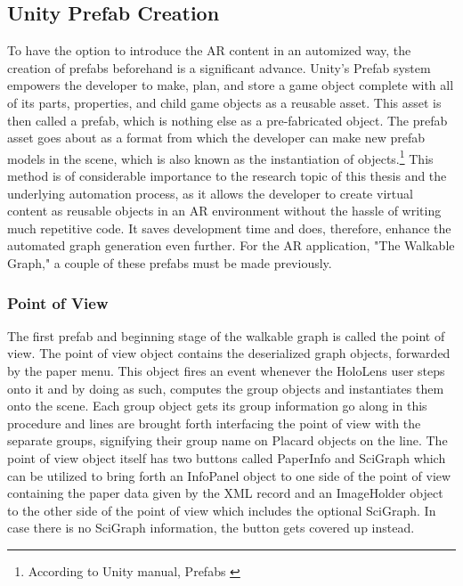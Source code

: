 \documentclass[12pt,a4paper,oneside,american,parskip=half]{article}
\begin{document}
\begin{justify}
\begin{normalsize}
\subsection{Unity Prefab Creation}
To have the option to introduce the AR content in an automized way, the creation of prefabs beforehand is a significant advance. Unity's Prefab system empowers the developer to make, plan, and store a game object complete with all of its parts, properties, and child game objects as a reusable asset. This asset is then called a prefab, which is nothing else as a pre-fabricated object. 
The prefab asset goes about as a format from which the developer can make new prefab models in the scene, which is also known as the instantiation of objects.\footnote{According to Unity manual, Prefabs \cite{unity1}}
\newline
This method is of considerable importance to the research topic of this thesis and the underlying automation process, as it allows the developer to create virtual content as reusable objects in an AR environment without the hassle of writing much repetitive code. It saves development time and does, therefore, enhance the automated graph generation even further.
\newline
For the AR application, "The Walkable Graph," a couple of these prefabs must be made previously.

\subsubsection{Point of View}
The first prefab and beginning stage of the walkable graph is called the point of view. The point of view object contains the deserialized graph objects, forwarded by the paper menu. This object fires an event whenever the HoloLens user steps onto it and by doing as such, computes the group objects and instantiates them onto the scene. Each group object gets its group information go along in this procedure and lines are brought forth interfacing the point of view with the separate groups, signifying their group name on Placard objects on the line.
\newline
The point of view object itself has two buttons called PaperInfo and SciGraph which can be utilized to bring forth an InfoPanel object to one side of the point of view containing the paper data given by the XML record and an ImageHolder object to the other side of the point of view which includes the optional SciGraph. 
In case there is no SciGraph information, the button gets covered up instead.
\clearpage


\end{normalsize}
\end{justify}
\end{document}
